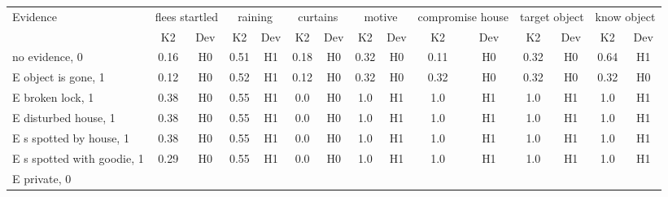 \begin{table}\begin{tabular}{l|cc|cc|cc|cc|cc|cc|cc}\toprule\multirow{2}{*}{Evidence} & \multicolumn{2}{c}{flees startled}& \multicolumn{2}{c}{raining}& \multicolumn{2}{c}{curtains}& \multicolumn{2}{c}{motive}& \multicolumn{2}{c}{compromise house}& \multicolumn{2}{c}{target object}& \multicolumn{2}{c}{know object}\\& {K2} & {Dev}& {K2} & {Dev}& {K2} & {Dev}& {K2} & {Dev}& {K2} & {Dev}& {K2} & {Dev}& {K2} & {Dev}\\\midrule
no evidence, 0 & \cellcolor{Bittersweet}0.16&\cellcolor{Bittersweet}H0&\cellcolor{Bittersweet}0.51&\cellcolor{Bittersweet}H1&\cellcolor{Bittersweet}0.18&\cellcolor{Bittersweet}H0&\cellcolor{Bittersweet}0.32&\cellcolor{Bittersweet}H0&\cellcolor{Bittersweet}0.11&\cellcolor{Bittersweet}H0&\cellcolor{Bittersweet}0.32&\cellcolor{Bittersweet}H0&\cellcolor{Bittersweet}0.64&\cellcolor{Bittersweet}H1\\E object is gone, 1 & \cellcolor{Bittersweet}0.12&\cellcolor{Bittersweet}H0&\cellcolor{Bittersweet}0.52&\cellcolor{Bittersweet}H1&\cellcolor{Bittersweet}0.12&\cellcolor{Bittersweet}H0&\cellcolor{Bittersweet}0.32&\cellcolor{Bittersweet}H0&\cellcolor{Bittersweet}0.32&\cellcolor{Bittersweet}H0&\cellcolor{Bittersweet}0.32&\cellcolor{Bittersweet}H0&\cellcolor{Bittersweet}0.32&\cellcolor{Bittersweet}H0\\E broken lock, 1 & \cellcolor{Bittersweet}0.38&\cellcolor{Bittersweet}H0&\cellcolor{Bittersweet}0.55&\cellcolor{Bittersweet}H1&\cellcolor{Bittersweet}0.0&\cellcolor{Bittersweet}H0&\cellcolor{Bittersweet}1.0&\cellcolor{Bittersweet}H1&\cellcolor{Bittersweet}1.0&\cellcolor{Bittersweet}H1&\cellcolor{Bittersweet}1.0&\cellcolor{Bittersweet}H1&\cellcolor{Bittersweet}1.0&\cellcolor{Bittersweet}H1\\E disturbed house, 1 & \cellcolor{Bittersweet}0.38&\cellcolor{Bittersweet}H0&\cellcolor{Bittersweet}0.55&\cellcolor{Bittersweet}H1&\cellcolor{Bittersweet}0.0&\cellcolor{Bittersweet}H0&\cellcolor{Bittersweet}1.0&\cellcolor{Bittersweet}H1&\cellcolor{Bittersweet}1.0&\cellcolor{Bittersweet}H1&\cellcolor{Bittersweet}1.0&\cellcolor{Bittersweet}H1&\cellcolor{Bittersweet}1.0&\cellcolor{Bittersweet}H1\\E s spotted by house, 1 & \cellcolor{Bittersweet}0.38&\cellcolor{Bittersweet}H0&\cellcolor{Bittersweet}0.55&\cellcolor{Bittersweet}H1&\cellcolor{Bittersweet}0.0&\cellcolor{Bittersweet}H0&\cellcolor{Bittersweet}1.0&\cellcolor{Bittersweet}H1&\cellcolor{Bittersweet}1.0&\cellcolor{Bittersweet}H1&\cellcolor{Bittersweet}1.0&\cellcolor{Bittersweet}H1&\cellcolor{Bittersweet}1.0&\cellcolor{Bittersweet}H1\\E s spotted with goodie, 1 & \cellcolor{Bittersweet}0.29&\cellcolor{Bittersweet}H0&\cellcolor{Bittersweet}0.55&\cellcolor{Bittersweet}H1&\cellcolor{Bittersweet}0.0&\cellcolor{Bittersweet}H0&\cellcolor{Bittersweet}1.0&\cellcolor{Bittersweet}H1&\cellcolor{Bittersweet}1.0&\cellcolor{Bittersweet}H1&\cellcolor{Bittersweet}1.0&\cellcolor{Bittersweet}H1&\cellcolor{Bittersweet}1.0&\cellcolor{Bittersweet}H1\\E private, 0 & 
\end{tabular}
\end{table}
